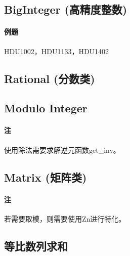 \subsection{BigInteger (高精度整数)}

\paragraph{例题} HDU1002，HDU1133，HDU1402



\subsection{Rational (分数类)}


\subsection{Modulo Integer}

\paragraph{注} 使用除法需要求解逆元函数get\_inv。



\subsection{Matrix (矩阵类)}

\paragraph{注} 若需要取模，则需要使用Zn进行特化。



\subsection{等比数列求和}

